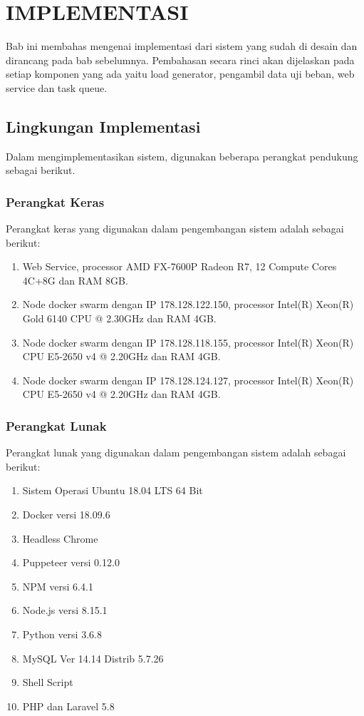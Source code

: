 \chapter{IMPLEMENTASI}
	Bab ini membahas mengenai implementasi dari sistem yang sudah di desain dan dirancang pada bab sebelumnya. Pembahasan secara rinci akan dijelaskan pada setiap komponen yang ada yaitu load generator, pengambil data uji beban, web service dan task queue.
	
	\section{Lingkungan Implementasi}
		Dalam mengimplementasikan sistem, digunakan beberapa perangkat pendukung sebagai berikut.
		
		\subsection{Perangkat Keras}
		Perangkat keras yang digunakan dalam pengembangan sistem adalah sebagai berikut:
		\begin{enumerate}
			\item Web Service, processor AMD FX-7600P Radeon R7, 12 Compute Cores 4C+8G dan RAM 8GB.
			\item Node docker swarm dengan IP 178.128.122.150, processor Intel(R) Xeon(R) Gold 6140 CPU @ 2.30GHz dan RAM 4GB.
			\item Node docker swarm dengan IP 178.128.118.155, processor Intel(R) Xeon(R) CPU E5-2650 v4 @ 2.20GHz dan RAM 4GB.
			\item Node docker swarm dengan IP 178.128.124.127, processor Intel(R) Xeon(R) CPU E5-2650 v4 @ 2.20GHz dan RAM 4GB.
		\end{enumerate}
	
		\subsection{Perangkat Lunak}
		Perangkat lunak yang digunakan dalam pengembangan sistem adalah sebagai berikut:
		\begin{enumerate}
			\item Sistem Operasi Ubuntu 18.04 LTS 64 Bit
			\item Docker versi 18.09.6 
			\item Headless Chrome 
			\item Puppeteer versi 0.12.0
			\item NPM versi 6.4.1
			\item Node.js versi 8.15.1
			\item Python versi 3.6.8
			\item MySQL Ver 14.14 Distrib 5.7.26
			\item Shell Script
			\item PHP dan Laravel 5.8
		\end{enumerate}
		
